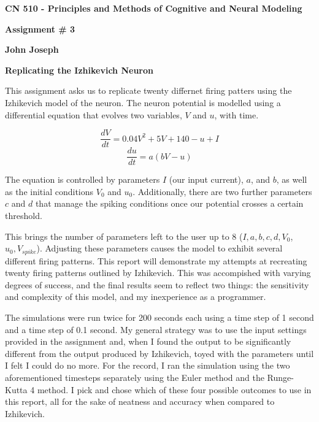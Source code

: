 \documentclass[a4paper,12pt]{article}
\begin{document}
\begin{center}
{\Large\bf CN 510 - Principles and Methods of Cognitive and Neural Modeling}

\bigskip

{\large\bf Assignment \# 3}
\smallskip

{\large\bf John Joseph}
\end{center}

\bigskip
{\bf Replicating the Izhikevich Neuron}
\bigskip

This assignment asks us to replicate twenty differnet firing patters using the Izhikevich model of the neuron. The neuron potential is modelled using a differential equation that evolves two variables, $V$ and $u$, with time. 

\begin{equation}
\frac{dV}{dt} = 0.04V^{2}+5V+140-u+I
\end{equation}
\begin{equation}
\frac{du}{dt} = a(bV-u)
\end{equation}

The equation is controlled by parameters $I$ (our input current), $a$, and $b$, as well as the initial conditions $V_{0}$ and $u_{0}$. Additionally, there are two further parameters $c$ and $d$ that manage the spiking conditions once our potential crosses a certain threshold. 

\vspace{2mm}

This brings the number of parameters left to the user up to 8 ($I, a, b, c, d, V_{0}$, $u_{0}, V_{spike}$). Adjusting these parameters causes the model to exhibit several different firing patterns. This report will demonstrate my attempts at recreating twenty firing patterns outlined by Izhikevich. This was accompished with varying degrees of success, and the final results seem to reflect two things: the sensitivity and complexity of this model, and my inexperience as a programmer. 

\vspace{2mm}

The simulations were run twice for 200 seconds each using a time step of 1 second and a time step of 0.1 second. My general strategy was to use the input settings provided in the assignment and, when I found the output to be significantly different from the output produced by Izhikevich, toyed with the parameters until I felt I could do no more. For the record, I ran the simulation using the two aforementioned timesteps separately using the Euler method and the Runge-Kutta 4 method. I pick and chose which of these four possible outcomes to use in this report, all for the sake of neatness and accuracy when compared to Izhikevich. 
\vspace{2mm}
\end{document}
